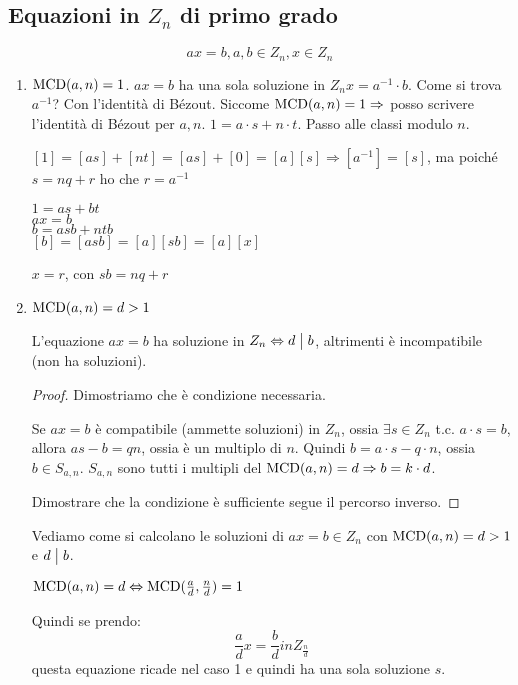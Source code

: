 \subsection{Equazioni in $Z_n$ di primo grado}
\[
ax = b, a, b \in Z_n, x \in Z_n
\]
\begin{enumerate}
    \item $\operatorname{MCD}(a, n) = 1$. $a x = b$ ha una sola soluzione in $Z_n x = a^{-1} \cdot b$. Come si trova $a^{-1}$? Con l'identit\`a di B\'ezout. Siccome $\operatorname{MCD}(a,n) = 1 \Rightarrow$ posso scrivere l'identit\`a di B\'ezout per $a, n$. $1 = a \cdot s + n \cdot t$. Passo alle classi modulo $n$.

    $[1] = [as] + [nt] = [as] + [0] = [a] [s] \Rightarrow [a^{-1}] = [s]$, ma poich\'e $s = n q + r$ ho che $r = a^{-1}$

    $1 = as + bt$ \\
    $ax = b$ \\
    $b = asb + ntb$ \\
    $[b] = [asb] = [a] [sb] = [a] [x]$

    $x = r$, con $sb = nq + r$

    \item $\operatorname{MCD}(a, n) = d > 1$

    \begin{prop}
    L'equazione $a x = b$ ha soluzione in $Z_n \Leftrightarrow d \bigm| b$, altrimenti \`e incompatibile (non ha soluzioni).
    \end{prop}
    \begin{proof}
    Dimostriamo che \`e condizione necessaria.

    Se $a x = b$ \`e compatibile (ammette soluzioni) in $Z_n$, ossia $\exists s \in Z_n$ t.c. $a \cdot s = b$, allora $a s - b = q n$, ossia \`e un multiplo di $n$. Quindi $b = a \cdot s - q \cdot n$, ossia $b \in S_{a, n}$. $S_{a,n}$ sono tutti i multipli del $\operatorname{MCD}(a,n) = d \Rightarrow b = k \cdot d$.

    Dimostrare che la condizione \`e sufficiente segue il percorso inverso.
    \end{proof}
    Vediamo come si calcolano le soluzioni di $ax = b \in Z_n$ con $\operatorname{MCD}(a,n) = d > 1$ e $d \bigm| b$.
    \begin{oss}
    $\operatorname{MCD}(a,n) = d \Leftrightarrow \operatorname{MCD}(\frac{a}{d}, \frac{n}{d}) = 1$
    \end{oss}
    Quindi se prendo:
    \[
    \frac{a}{d} x = \frac{b}{d} in Z_{\frac{n}{d}} 
    \]
    questa equazione ricade nel caso 1 e quindi ha una sola soluzione $s$.


\end{enumerate}
